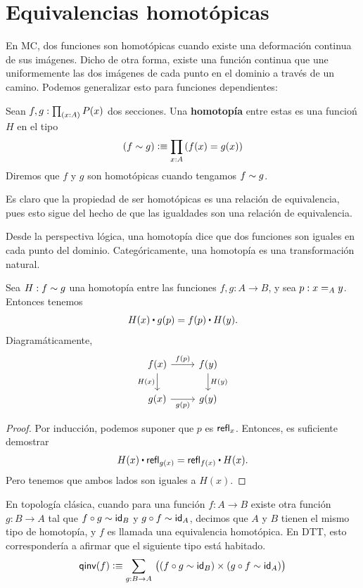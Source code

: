 \documentclass[../main.tex]{subfiles}
\begin{document}
\section{Equivalencias homot\'opicas}\label{sec-equivs}
En MC, dos funciones son homot\'opicas cuando existe una deformaci\'on continua de sus im\'agenes.
Dicho de otra forma, existe una función continua que une uniformemente las dos im\'agenes de cada punto en el dominio a trav\'es de un camino.
Podemos generalizar esto para funciones dependientes:

\begin{definition}
  Sean $f,g:\tprd{x:A}P(x)$ dos secciones. Una \textbf{homotop\'ia} entre estas es una funcio\'n $H$ en el tipo
  \[(f\htpy g) \defeq \prd{x:A}(f(x)=g(x))\]
  Diremos que $f$ y $g$ son homot\'opicas cuando tengamos $f\htpy g$.
\end{definition}

Es claro que la propiedad de ser homot\'opicas es una relaci\'on de equivalencia, pues esto sigue del hecho de que las igualdades son una relaci\'on de equivalencia.

Desde la perspectiva l\'ogica, una homotop\'ia dice que dos funciones son iguales en cada punto del dominio.
Categ\'oricamente, una homotopía es una transformación natural.


\begin{lemma}\label{htpy-nattrans}
  Sea $H:f\htpy g$ una homotop\'ia entre las funciones $f,g:A\to B$, y sea $p:\id[A]xy$.
  Entonces tenemos
  \begin{equation*}
    H(x)\ct\ap{g}{p}=\ap{f}{p}\ct H(y).
  \end{equation*}
  Diagram\'aticamente,
  \[\begin{tikzcd}
      {f(x)} & {f(y)} \\
      {g(x)} & {g(y)}
      \arrow["{H(y)}", from=1-2, to=2-2]
      \arrow["{g(p)}"', from=2-1, to=2-2]
      \arrow["{H(x)}"', from=1-1, to=2-1]
      \arrow["{f(p)}", from=1-1, to=1-2]
    \end{tikzcd}\]
\end{lemma}
\begin{proof}
  Por inducci\'on, podemos suponer que $p$ es $\refl x$.
  Entonces, es suficiente demostrar
  \[ H(x) \ct \refl{g(x)} = \refl{f(x)} \ct H(x). \]
  Pero tenemos que ambos lados son iguales a $H(x)$.
\end{proof}

En topolog\'ia cl\'asica, cuando para una funci\'on $f:A \to B$ existe otra funci\'on $g:B\to A$ tal que $f\circ g \htpy \idfunc[B]$ y $g\circ f \htpy \idfunc[A]$, decimos que $A$ y $B$ tienen el mismo tipo de homotop\'ia, y $f$ es llamada una equivalencia homot\'opica.
En DTT, esto corresponder\'ia a afirmar que el siguiente tipo est\'a habitado.
\begin{equation*}
  \mathsf{qinv}(f) \defeq \sm{g:B\to A} \big((f \circ g \htpy \idfunc[B]) \times (g\circ f \htpy \idfunc[A])\big)\label{eq:qinvtype}
\end{equation*}
\end{document}

